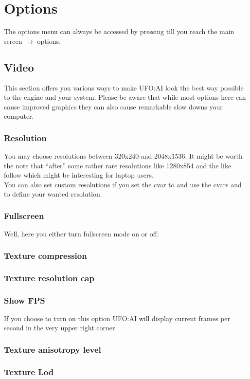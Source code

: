 \section{Options}
The options menu can always be accessed by pressing  till you reach the main screen $\rightarrow$ options.

\subsection{Video}
This section offers you various ways to make UFO:AI look the best way possible to the engine and your system. Please be aware that while most options here can cause improved graphics they can also cause remarkable slow downs your computer.
\subsubsection*{Resolution}
You may choose resolutions between 320x240 and 2048x1536. It might be worth the note that ``after'' some rather rare resolutions like 1280x854 and the like follow which might be interesting for laptop users.\\
You can also set custom resolutions if you set the cvar  to  and use the cvars  and  to define your wanted resolution.
\subsubsection*{Fullscreen}
Well, here you either turn fullscreen mode on or off.
\subsubsection*{Texture compression}
\subsubsection*{Texture resolution cap}
\subsubsection*{Show FPS}
If you choose to turn on this option UFO:AI will display current frames per second in the very upper right corner.
\subsubsection*{Texture anisotropy level}
\subsubsection*{Texture Lod}
